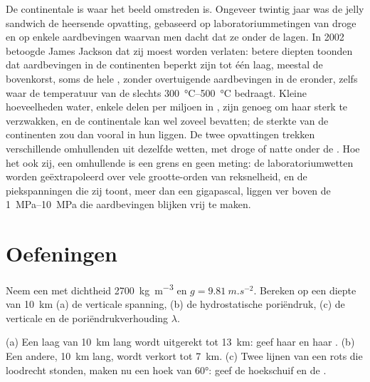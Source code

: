 De continentale  is waar het beeld omstreden is. Ongeveer twintig jaar was de jelly sandwich de heersende opvatting, gebaseerd op laboratoriummetingen van droge  en op enkele aardbevingen waarvan men dacht dat ze onder de  lagen. In 2002 betoogde James Jackson dat zij moest worden verlaten: betere diepten toonden dat aardbevingen in de continenten beperkt zijn tot één laag, meestal de bovenkorst, soms de hele , zonder overtuigende aardbevingen in de  eronder, zelfs waar de temperatuur van de  slechts \qtyrange{300}{500}{\degreeCelsius} bedraagt. Kleine hoeveelheden water, enkele delen per miljoen in , zijn genoeg om haar sterk te verzwakken, en de continentale  kan wel zoveel bevatten; de sterkte van de continenten zou dan vooral in hun  liggen. De twee opvattingen trekken verschillende omhullenden uit dezelfde wetten, met droge of natte  onder de .
Hoe het ook zij, een omhullende is een grens en geen meting: de laboratoriumwetten worden geëxtrapoleerd over vele grootte-orden van reksnelheid, en de piekspanningen die zij toont, meer dan een gigapascal, liggen ver boven de \qtyrange{1}{10}{MPa} die aardbevingen blijken vrij te maken.

\section{Oefeningen}

\begin{exercise}[$\star$]\label{exo:b1:stress-strain-rheology:1}
Neem een  met dichtheid \qty{2700}{kg.m^{-3}} en $g = \qty{9.81}{m.s^{-2}}$. Bereken op een diepte van \qty{10}{km} (a) de verticale spanning, (b) de hydrostatische poriëndruk, (c) de verticale  en de poriëndrukverhouding $\lambda$.
\end{exercise}

\begin{exercise}[$\star$]\label{exo:b1:stress-strain-rheology:2}
(a) Een laag van \qty{10}{km} lang wordt uitgerekt tot \qty{13}{km}: geef haar  en haar . (b) Een andere, \qty{10}{km} lang, wordt verkort tot \qty{7}{km}. (c) Twee lijnen van een rots die loodrecht stonden, maken nu een hoek van \ang{60}: geef de hoekschuif en de .
\end{exercise}

